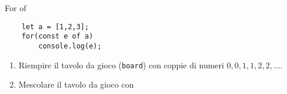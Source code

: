 \begin{frame}[fragile]{For of}\transfade\centering
\begin{verbatim}
    let a = [1,2,3];
    for(const e of a)
        console.log(e);
\end{verbatim}
\end{frame}


\begin{frame}[fragile]\transfade
  \begin{exercise}\centering
    \begin{enumerate}
      \item Riempire il tavolo da gioco (\texttt{board}) con coppie di numeri $0,0,1,1,2,2,\dots$.
      \item Mescolare il tavolo da gioco con
      \begin{algorithm}[H]\normalfont\small
        \For{$i\leftarrow N-1$ \KwTo $0$}{
          j $\leftarrow$ intero random $\colon$ 0 $\leqslant$ j < i \tcp*{ovvero $\lfloor$ random($[0,1)$)$\cdot$ i $\rfloor$~~\\in JS \mintjs{Math.floor(Math.random() * i})~~}
          [V[i], V[j]] = [V[j], V[i]] \tcp*{Scambia elementi in posizione i e j~~}
        }
      \end{algorithm}
    \end{enumerate}
  \end{exercise}
\end{frame}

